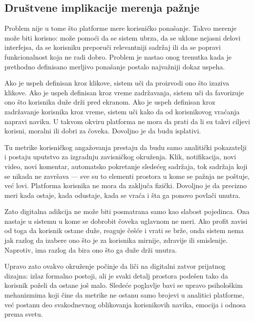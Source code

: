 \subsection{Društvene implikacije merenja pažnje}

Problem nije u tome što platforme mere korisničko ponašanje. Takvo merenje može biti korisno: može pomoći da se sistem ubrza, da se uklone nejasni delovi interfejsa, da se korisniku preporuči relevantniji sadržaj ili da se popravi funkcionalnost koja ne radi dobro. Problem je nastao onog trenutka kada je prethodno definisano merljivo ponašanje postalo najvažniji dokaz uspeha.

Ako je uspeh definisan kroz klikove, sistem uči da proizvodi ono što izaziva klikove. Ako je uspeh definisan kroz vreme zadržavanja, sistem uči da favorizuje ono što korisnika duže drži pred ekranom. Ako je uspeh definisan kroz zadržavanje korisnika kroz vreme, sistem uči kako da od korisnikovog vraćanja napravi naviku. U takvom okviru platforma ne mora da prati da li su takvi ciljevi korisni, moralni ili dobri za čoveka. Dovoljno je da budu isplativi.

Tu metrike korisničkog angažovanja prestaju da budu samo analitički pokazatelji i postaju uputstvo za izgradnju zavisničkog okruženja. Klik, notifikacija, novi video, novi komentar, automatsko pokretanje sledećeg sadržaja, tok sadržaja koji se nikada ne završava — sve su to elementi prostora u kome se pažnja ne poštuje, već lovi. Platforma korisnika ne mora da zaključa fizički. Dovoljno je da precizno meri kada ostaje, kada odustaje, kada se vraća i šta ga ponovo povlači unutra.

Zato digitalna adikcija ne može biti posmatrana samo kao slabost pojedinca. Ona nastaje u sistemu u kome se dobrobit čoveka uglavnom ne meri. Ako profit zavisi od toga da korisnik ostane duže, reaguje češće i vrati se brže, onda sistem nema jak razlog da izabere ono što je za korisnika mirnije, zdravije ili smislenije. Naprotiv, ima razlog da bira ono što ga duže drži unutra.

Upravo zato ovakvo okruženje počinje da liči na digitalni zatvor prijatnog dizajna: izlaz formalno postoji, ali je svaki detalj prostora podešen tako da korisnik poželi da ostane još malo. Sledeće poglavlje bavi se upravo psihološkim mehanizmima koji čine da metrike ne ostanu samo brojevi u analitici platforme, već postanu deo svakodnevnog oblikovanja korisnikovih navika, emocija i odnosa prema svetu.